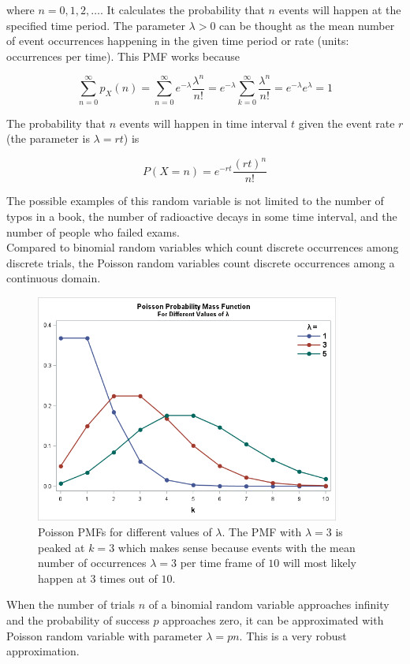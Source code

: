 \documentclass[12pt, a4paper]{article}
\newcounter{exa}
\begin{document}
where $n=0,1,2,\dots$. It calculates the probability that $n$ events will happen at the specified time period. The parameter $\lambda>0$ can be thought as the mean number of event occurrences happening in the given time period or rate (units: occurrences per time). This PMF works because

$$\sum_{n=0}^\infty p_X(n) = \sum_{n=0}^\infty e^{-\lambda}\frac{\lambda^n}{n!} = e^{-\lambda} \sum_{k=0}^\infty \frac{\lambda^n}{n!}=e^{-\lambda}e^\lambda=1$$

The probability that $n$ events will happen in time interval $t$ given the event rate $r$ (the parameter is $\lambda=rt$) is

$$P(X=n)=e^{-rt}\frac{(rt)^n}{n!}$$

The possible examples of this random variable is not limited to the number of typos in a book, the number of radioactive decays in some time interval, and the number of people who failed exams. \\

Compared to binomial random variables which count discrete occurrences among discrete trials, the Poisson random variables count discrete occurrences among a continuous domain.

\begin{figure}[H]
\centering
\includegraphics[width=100mm]{11.png}
\caption{Poisson PMFs for different values of $\lambda$. The PMF with $\lambda=3$ is peaked at $k=3$ which makes sense because events with the mean number of occurrences $\lambda=3$ per time frame of $10$ will most likely happen at $3$ times out of $10$.}
\end{figure}

When the number of trials $n$ of a binomial random variable approaches infinity and the probability of success $p$ approaches zero, it can be approximated with Poisson random variable with parameter $\lambda=pn$. This is a very robust approximation. \\
\end{document}
